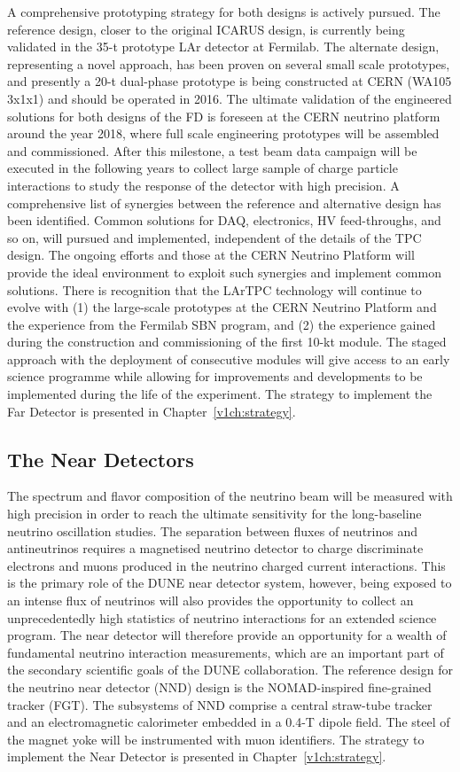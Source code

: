 A  comprehensive prototyping strategy for both designs is actively pursued.
The reference design, closer to the original ICARUS design, is currently being validated in the 35-t prototype LAr detector at Fermilab.  The alternate design, representing a novel approach, has been proven on several
small scale prototypes, and presently
a 20-t dual-phase prototype is being constructed at CERN (WA105 3x1x1) and should be operated in 2016. 
The ultimate validation of the engineered solutions for both designs of the FD is foreseen at 
the CERN neutrino platform around the year 2018, where full scale engineering prototypes will be 
assembled and commissioned. After this milestone, a test beam data 
campaign will be executed in the following years to collect large sample of charge particle interactions
to study the response of the detector with high precision.
A comprehensive list of synergies between the reference and alternative design has been identified. Common solutions for DAQ, electronics, HV feed-throughs, and so on, will pursued and implemented, independent of the details of the TPC design. The ongoing efforts and those at the CERN Neutrino Platform will
provide the ideal environment to exploit such synergies and implement common solutions.
There is recognition that the LArTPC technology will continue to evolve with (1) the large-scale prototypes at the CERN Neutrino Platform and the experience from the Fermilab SBN program, and (2) the experience gained during the construction and commissioning of the first 10-kt module. 
The staged approach with the deployment of consecutive modules will
give access to an early science programme while allowing for improvements and developments to be implemented during the life of the experiment.
The strategy to implement
the Far Detector is presented in Chapter~\ref{v1ch:strategy}.

\subsection{The Near Detectors}
The spectrum and flavor composition of the neutrino beam will be measured with high precision 
in order to reach the ultimate sensitivity for the long-baseline neutrino oscillation studies.
The separation between fluxes of neutrinos and antineutrinos requires a magnetised neutrino detector to 
charge discriminate electrons and muons produced in the neutrino charged current interactions.
This is the primary role of the DUNE near detector system, however, being exposed to an intense flux of neutrinos
will also provides the opportunity to collect an unprecedentedly high statistics of neutrino 
interactions  for an extended science program. 
The near detector will therefore provide an opportunity for a wealth of fundamental neutrino interaction 
measurements, which are an important part of the secondary scientific goals of the DUNE collaboration. 
The reference design for the neutrino near detector (NND) design is the NOMAD-inspired fine-grained tracker (FGT). The subsystems of NND comprise a central 
straw-tube tracker and an electromagnetic calorimeter embedded in a 0.4-T dipole field. The steel of the
magnet yoke will be instrumented with muon identifiers. The strategy to implement
the Near Detector is presented in Chapter~\ref{v1ch:strategy}.

